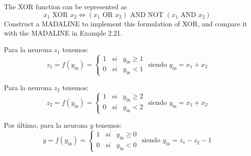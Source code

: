 \begin{problem}[18]
The XOR function can be represented as
\[x_1 \text{ XOR } x_2 \iff (x_1 \text{ OR } x_2 ) \text{ AND NOT }(x_1 \text{ AND } x_2)\]
Construct a MADALINE to implement this formulation of XOR, and compare it with
the MADALINE in Example 2.21.
\solution

\begin{center}


\end{center}


Para la neurona $z_1$ tenemos:
\[z_1=f(y_{\text{in}})=\left\{\begin{array}{lll}
1 & si & y_{\text{in}} \geq 1 \\
0 & si & y_{\text{in}} < 1
\end{array}\right. \text{ siendo } y_{\text{in}} = x_1+x_2\]

Para la neurona $z_2$ tenemos:
\[z_2=f(y_{\text{in}})=\left\{\begin{array}{lll}
1 & si & y_{\text{in}} \geq 2 \\
0 & si & y_{\text{in}} < 2
\end{array}\right. \text{ siendo } y_{\text{in}} = x_1+x_2\]

Por último, para la neurona $y$ tenemos:
\[y=f(y_{\text{in}})=\left\{\begin{array}{lll}
1 & si & y_{\text{in}} \geq 0 \\
0 & si & y_{\text{in}} < 0
\end{array}\right. \text{ siendo } y_{\text{in}} = z_1-z_2-1\]
\end{problem}

